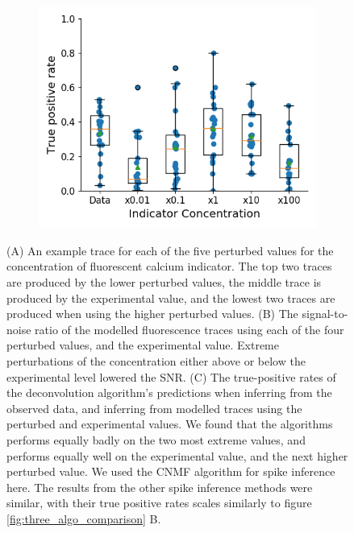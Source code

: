 \begin{figure}[p]
\begin{subfigure}{0.45\textwidth}
        \includegraphics[width=\linewidth]{figures/calcium_chapter/indictor_perturbed_oasis_first_paper.png}
        \caption{}
        \label{fig:indicator_perturbed_inference}
    \end{subfigure}
    \caption{(A) An example trace for each of the five perturbed values for the concentration of fluorescent calcium indicator. The top two traces are produced by the lower perturbed values, the middle trace is produced by the experimental value, and the lowest two traces are produced when using the higher perturbed values. (B) The signal-to-noise ratio of the modelled fluorescence traces using each of the four perturbed values, and the experimental value. Extreme perturbations of the concentration either above or below the experimental level lowered the SNR. (C) The true-positive rates of the deconvolution algorithm's predictions when inferring from the observed data, and inferring from modelled traces using the perturbed and experimental values. We found that the algorithms performs equally badly on the two most extreme values, and performs equally well on the experimental value, and the next higher perturbed value. We used the CNMF algorithm for spike inference here. The results from the other spike inference methods were similar, with their true positive rates scales similarly to figure \ref{fig:three_algo_comparison} B.}
    \label{fig:indicator_perturbed}
\end{figure}

